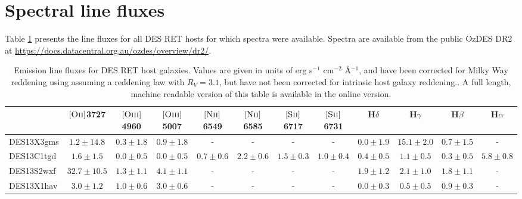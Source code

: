 \documentclass[fleqn,usenatbib,]{mnras}
\newcommand{\replyref}[1]{\color{magenta}#1 \color{black}}
\newcommand{\halpha}[0]{H$\alpha$}
\newcommand{\hbeta}[0]{H$\beta$}
\newcommand{\hgamma}[0]{H$\gamma$}
\newcommand{\hdelta}[0]{H$\delta$}
\newcommand{\OII}[0]{$[\textnormal{\textsc{Oii}}]$}
\newcommand{\OIII}[0]{$[\textnormal{\textsc{Oiii}}]$}
\newcommand{\SII}[0]{$[\textnormal{\textsc{Sii}}]$}
\newcommand{\NII}[0]{$[\textnormal{\textsc{Nii}}]$}
\begin{document}

\appendix
\section{Spectral line fluxes}
Table \ref{tab:fluxes} presents the line fluxes for all DES RET hosts for which spectra were available. Spectra are available from the public OzDES DR2 at \url{https://docs.datacentral.org.au/ozdes/overview/dr2/}.

\begin{table}

\caption{Emission line fluxes for DES RET host galaxies. Values are given in units of erg s$^{-1}$ cm$^{-2}$ \AA$^{-1}$, and have been corrected for Milky Way reddening using \citet{Schlegel1998} assuming a \citet{Cardelli1989} reddening law with $R_V = 3.1$, but have not been corrected for intrinsic host galaxy reddening.\label{tab:fluxes}. \replyref{A full length, machine readable version of this table is available in the online version.}}
\setlength{\tabcolsep}{3pt}
\begin{tabular}{lccccccccccc}
\toprule
{} &              \OII 3727 &             \OIII 4960 &              \OIII 5007 &             \NII 6549 &             \NII 6585 &             \SII 6717 &             \SII 6731 &           \hdelta &            \hgamma &             \hbeta &            \halpha \\
\midrule
DES13X3gms  &   $1.2 \pm 14.8$ &  $0.3 \pm 1.8$ &   $0.9 \pm 1.8$ &              - &               - &              - &              - &  $0.0 \pm 1.9$ &  $15.1 \pm 2.0$ &   $0.7 \pm 1.5$ &               - \\
DES13C1tgd  &    $1.6 \pm 1.5$ &  $0.0 \pm 0.5$ &   $0.0 \pm 0.5$ &  $0.7 \pm 0.6$ &   $2.2 \pm 0.6$ &  $1.5 \pm 0.3$ &  $1.0 \pm 0.4$ &  $0.4 \pm 0.5$ &   $1.1 \pm 0.5$ &   $0.3 \pm 0.5$ &   $5.8 \pm 0.8$ \\
DES13S2wxf  &  $32.7 \pm 10.5$ &  $1.3 \pm 1.1$ &   $4.1 \pm 1.1$ &              - &               - &              - &              - &  $1.9 \pm 1.2$ &   $2.1 \pm 1.0$ &   $1.8 \pm 1.1$ &               - \\
DES13X1hav  &    $3.0 \pm 1.2$ &  $1.0 \pm 0.6$ &   $3.0 \pm 0.6$ &              - &               - &              - &              - &  $0.0 \pm 0.3$ &   $0.5 \pm 0.5$ &   $0.9 \pm 0.3$ &               - \\

\bottomrule
\end{tabular}
\end{table}
\end{document}
